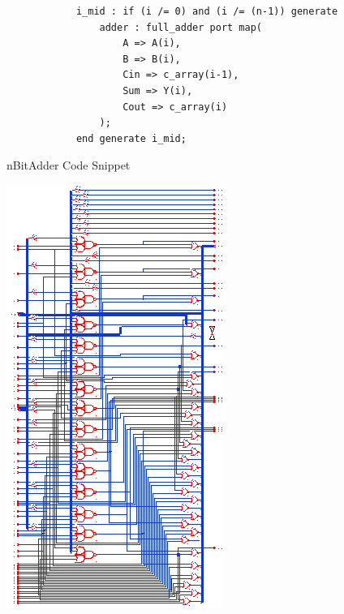 \documentclass[11pt]{article}
\begin{document}
		\begin{figure}[H]
		\centering
		\begin{verbatim}
            i_mid : if (i /= 0) and (i /= (n-1)) generate
                adder : full_adder port map(
                    A => A(i),
                    B => B(i),
                    Cin => c_array(i-1),
                    Sum => Y(i),
                    Cout => c_array(i)
                );
            end generate i_mid;
        \end{verbatim}
        \caption{nBitAdder Code Snippet} 
    	\label{code:nBitAdder} 
    	\end{figure}
	
		\begin{figure}[H] 
			\centering 
			\includegraphics[width=\textwidth,height=\dimexpr\textheight-4\baselineskip-\abovecaptionskip-\belowcaptionskip\relax,keepaspectratio]{"Pictures/nBitAdder Schematic Page 1"}

\end{figure}
\end{document}

